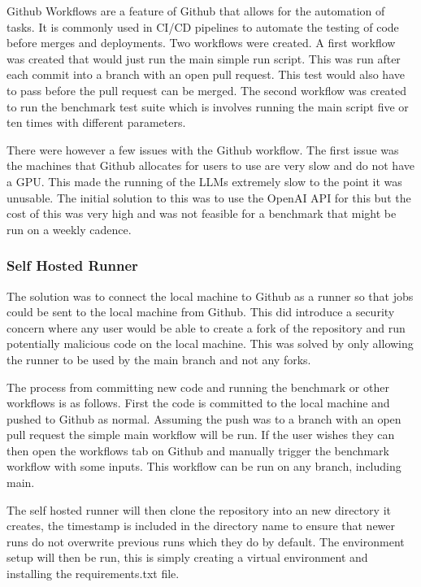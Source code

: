 \documentclass[12pt]{extarticle}
\begin{document}
Github Workflows are a feature of Github that allows for the automation of tasks. It is commonly used in CI/CD pipelines to automate the testing of code before merges and deployments. Two workflows were created. A first workflow was created that would just run the main simple run script. This was run after each commit into a branch with an open pull request. This test would also have to pass before the pull request can be merged. The second workflow was created to run the benchmark test suite which is involves running the main script five or ten times with different parameters.

There were however a few issues with the Github workflow. The first issue was the machines that Github allocates for users to use are very slow and do not have a GPU. This made the running of the LLMs extremely slow to the point it was unusable. The initial solution to this was to use the OpenAI API for this but the cost of this was very high and was not feasible for a benchmark that might be run on a weekly cadence.

\subsubsection{Self Hosted Runner}

The solution was to connect the local machine to Github as a runner so that jobs could be sent to the local machine from Github. This did introduce a security concern where any user would be able to create a fork of the repository and run potentially malicious code on the local machine. This was solved by only allowing the runner to be used by the main branch and not any forks.

The process from committing new code and running the benchmark or other workflows is as follows. First the code is committed to the local machine and pushed to Github as normal. Assuming the push was to a branch with an open pull request the simple main workflow will be run. If the user wishes they can then open the workflows tab on Github and manually trigger the benchmark workflow with some inputs. This workflow can be run on any branch, including main.

The self hosted runner will then clone the repository into an new directory it creates, the timestamp is included in the directory name to ensure that newer runs do not overwrite previous runs which they do by default. The environment setup will then be run, this is simply creating a virtual environment and installing the requirements.txt file.
\end{document}
